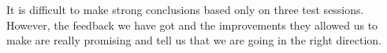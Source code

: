 \documentclass[a4paper,12pt, oneside]{article}
\begin{document}
It is difficult to make strong conclusions based only on three test sessions.
However, the feedback we have got and the improvements they allowed us to make are really promising and tell us that we are going in the right direction.




\clearpage


\end{document}
